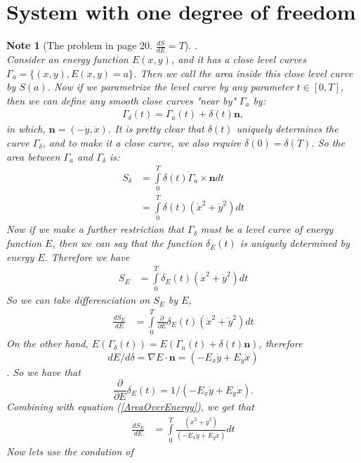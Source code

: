 \documentclass[pdf]{article}
\newcommand{\vect}[1]{\boldsymbol{#1}}
\newtheorem{note}[theorem]{Note}
\begin{document}
\section{System with one degree of freedom}
\begin{note}[The problem in page 20. $\frac{dS}{dE} = T$].\\
Consider an energy function $E(x,y)$, and it has a close level curves $\Gamma_{a} = \{(x,y), E(x,y) = a\}$. Then we call the area inside this close level curve by $S(a)$. Now if we parametrize the level curve by any parameter $t\in[0,T]$, then we can define any smooth close curves "near by" $\Gamma_a$ by:
\begin{align*}
\Gamma_\delta(t) = \Gamma_a(t) + \delta(t)\vect{n},
\end{align*}
in which, $\vect{n} = (-\dot{y}, \dot{x})$. It is pretty clear that $\delta(t)$ uniquely determines the curve $\Gamma_\delta$, and to make it a close curve, we also require $\delta(0) = \delta(T)$. So the area between $\Gamma_a$ and $\Gamma_\delta$ is:
\begin{align*}
S_\delta &= \int\limits_0^T \delta(t)\dot{\Gamma}_a\times \vect{n}dt\\
              &= \int\limits_0^T \delta(t)(\dot{x}^2 + \dot{y}^2)dt 
\end{align*}
Now if we make a further restriction that $\Gamma_\delta$ must be a level curve of energy function $E$, then we can say that the function $\delta_E(t)$ is uniquely determined by energy $E$. Therefore we have
\begin{align*}
S_E &= \int\limits_0^T \delta_E(t)(\dot{x}^2 + \dot{y}^2)dt
\end{align*}
So we can take differenciation on $S_E$ by $E$,
\begin{align}\label{AreaOverEnergy}
\frac{dS_E}{dE} &= \int\limits_0^T \frac{\partial}{\partial E}\delta_E(t)(\dot{x}^2 + \dot{y}^2)dt
\end{align}
On the other hand, $E(\Gamma_\delta(t)) = E(\Gamma_a(t) + \delta(t)\vect{n})$, therefore $$dE/d\delta = \nabla E\cdot \vect{n} = (-E_x\dot{y} + E_y\dot{x})$$. So we have that $$\frac{\partial}{\partial E}\delta_E(t) = 1/(-E_x\dot{y} + E_y\dot{x}).$$
Combining with equation (\ref{AreaOverEnergy}), we get that
\begin{align*}
\frac{dS_E}{dE} &= \int\limits_0^T \frac{(\dot{x}^2 + \dot{y}^2)}{(-E_x\dot{y} + E_y\dot{x})}dt
\end{align*}
Now lets use the condation of 
\begin{align}\label{MotionEquation}

\end{align}
\end{note}
\end{document}
